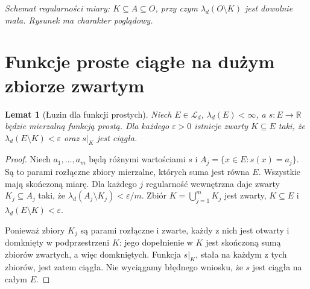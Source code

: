 \documentclass[11pt,a4paper,oneside]{book}
\numberwithin{equation}{chapter}
\theoremstyle{plain}
\newtheorem{lemat}[twierdzenie]{Lemat}
\theoremstyle{definition}
\theoremstyle{remark}
\begin{document}
\begin{center}
\par\smallskip
\textit{Schemat regularności miary: $K\subseteq A\subseteq O$,
przy czym $\lambda_d(O\setminus K)$ jest dowolnie mała.
Rysunek ma charakter poglądowy.}
\end{center}

\section{Funkcje proste ciągłe na dużym zbiorze zwartym}

\begin{lemat}[Łuzin dla funkcji prostych]
\label{lem:lusin-simple-10}
Niech $E\in\mathcal L_d$, $\lambda_d(E)<\infty$,
a $s:E\to\mathbb R$ będzie mierzalną funkcją prostą.
Dla każdego $\varepsilon>0$ istnieje zwarty
$K\subseteq E$ taki, że
$\lambda_d(E\setminus K)<\varepsilon$ oraz
$s|_K$ jest ciągła.
\end{lemat}
\begin{proof}
Niech $a_1,\dots,a_m$ będą różnymi wartościami $s$
i $A_j=\{x\in E:s(x)=a_j\}$.
Są to parami rozłączne zbiory mierzalne, których
suma jest równa $E$. Wszystkie mają skończoną miarę.
Dla każdego $j$ regularność wewnętrzna daje
zwarty $K_j\subseteq A_j$ taki, że
$\lambda_d(A_j\setminus K_j)<\varepsilon/m$.
Zbiór $K=\bigcup_{j=1}^mK_j$ jest zwarty,
$K\subseteq E$ i
$\lambda_d(E\setminus K)<\varepsilon$.

Ponieważ zbiory $K_j$ są parami rozłączne i zwarte,
każdy z nich jest otwarty i domknięty w podprzestrzeni
$K$: jego dopełnienie w $K$ jest skończoną sumą
zbiorów zwartych, a więc domkniętych.
Funkcja $s|_K$, stała na każdym z tych zbiorów,
jest zatem ciągła. Nie wyciągamy błędnego wniosku,
że $s$ jest ciągła na całym $E$.
\end{proof}
\end{document}
